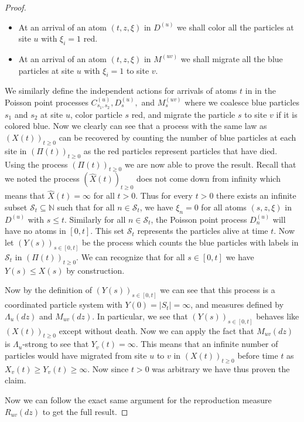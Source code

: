 \documentclass[11pt]{article}
\theoremstyle{definition}
\newcommand{\N}{\mathbb{N}}
\begin{document}
\begin{proof}
\begin{itemize}
        \item At an arrival of an atom $(t,z, \xi)$ in $D^{(u)}$ we shall color all the particles at site $u$ with $\xi_i = 1$ red.

        \item At an arrival of an atom $(t,z, \xi)$ in $M^{(uv)}$ we shall migrate all the blue particles at site $u$ with $\xi_i = 1$ to site $v$.
    \end{itemize}

    \noindent We similarly define the independent actions for arrivals of atoms $t$ in in the Poisson point processes $C_{s_1,s_2}^{(u)}, D_s^{(u)},$ and $M_s^{(uv)}$ where we coalesce blue particles $s_1$ and $s_2$ at site $u$, color particle $s$ red, and migrate the particle $s$ to site $v$ if it is colored blue. Now we clearly can see that a process with the same law as $(X(t))_{t \geq 0}$ can be recovered by counting the number of blue particles at each site in $(\Pi(t))_{t \geq 0}$ as the red particles represent particles that have died. Using the process $(\Pi(t))_{t\geq 0}$ we are now able to prove the result. Recall that we noted the process $(\widehat{X}(t))_{t \geq 0}$ does not come down from infinity which means that $\widehat{X}(t) = \infty$ for all $t > 0$. Thus for every $t > 0$ there exists an infinite subset $\mathcal{S}_t \subseteq \N$ such that for all $n \in \mathcal{S}_t$, we have $\xi_n = 0$ for all atoms $(s,z, \xi)$ in $D^{(u)}$ with $s \leq t$. Similarly for all $n \in \mathcal{S}_t$, the Poisson point process $D_n^{(u)}$ will have no atoms in $[0,t]$. This set $\mathcal{S}_t$ represents the particles alive at time $t$. Now let $(Y(s))_{s \in [0,t]}$ be the process which counts the blue particles with labels in $\mathcal{S}_t$ in $(\Pi(t))_{t \geq 0}$. We can recognize that for all $s \in [0,t]$ we have $Y(s) \leq X(s)$ by construction. 
    \medskip
    
    \noindent Now by the definition of $(Y(s))_{s \in [0,t]}$ we can see that this process is a coordinated particle system with $Y(0) = |S_t| = \infty$, and measures defined by $\Lambda_u(dz)$ and $M_{uv}(dz)$. In particular, we see that $(Y(s))_{s \in [0,t]}$ behaves like $(X(t))_{t \geq 0}$ except without death. Now we can apply the fact that $M_{uv}(dz)$ is $\Lambda_u$-strong to see that $Y_v(t) = \infty$. This means that an infinite number of particles would have migrated from site $u$ to $v$ in $(X(t))_{t \geq 0}$ before time $t$ as $X_v(t) \geq Y_v(t) \geq \infty$. Now since $t > 0$ was arbitrary we have thus proven the claim.
    \medskip
    
    \noindent Now we can follow the exact same argument for the reproduction measure $R_{uv}(dz)$ to get the full result.
\end{proof}
\end{document}
